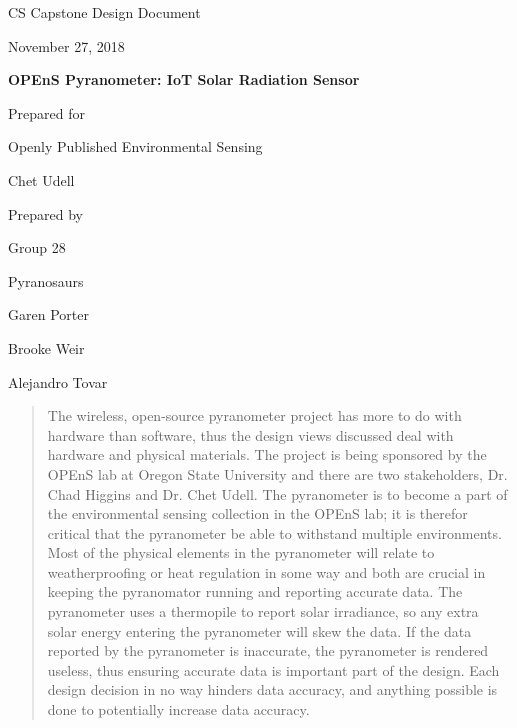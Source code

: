 \documentclass[10pt,draftclsnofoot,onecolumn,letterpaper]{article}
\def \CapstoneTeamName{		Pyranosaurs}
\def \CapstoneTeamNumber{		28}
\def \GroupMemberOne{			Garen Porter}
\def \GroupMemberTwo{			Brooke Weir}
\def \GroupMemberThree{			Alejandro Tovar}
\def \CapstoneProjectName{		OPEnS Pyranometer: IoT Solar Radiation Sensor}
\def \CapstoneSponsorCompany{	Openly Published Environmental Sensing}
\def \CapstoneSponsorPerson{		Chet Udell}
\def \DocType{		%
				Design Document
				}
\newcommand{\NameSigPair}[1]{\par
\makebox[2.75in][r]{#1} \hfil 	\makebox[3.25in]{\makebox[2.25in]{\hrulefill} \hfill		\makebox[.75in]{\hrulefill}}
\par\vspace{-12pt} \textit{\tiny\noindent
\makebox[2.75in]{} \hfil		\makebox[3.25in]{\makebox[2.25in][r]{Signature} \hfill	\makebox[.75in][r]{Date}}}}
\renewcommand{\NameSigPair}[1]{#1}
\begin{document}
\begin{titlepage}
    \begin{singlespace}
        \hfill 
        \par\vspace{.2in}
        \centering
        \scshape{
            \huge CS Capstone \DocType \par
            {\large November 27, 2018}\par
            \vspace{.5in}
            \textbf{\Huge\CapstoneProjectName}\par
            \vfill
            {\large Prepared for}\par
            \Huge \CapstoneSponsorCompany\par
            \vspace{5pt}
            {\Large\NameSigPair{\CapstoneSponsorPerson}\par}
            {\large Prepared by }\par
            Group\CapstoneTeamNumber\par
            \CapstoneTeamName\par 
            \vspace{5pt}
            {\Large
                \NameSigPair{\GroupMemberOne}\par
                \NameSigPair{\GroupMemberTwo}\par
                \NameSigPair{\GroupMemberThree}\par
            }
            \vspace{20pt}
        }
        \begin{abstract}
        The wireless, open-source pyranometer project has more to do with hardware than software, thus the design views discussed deal with hardware and physical materials. The project is being sponsored by the OPEnS lab at Oregon State University and there are two stakeholders, Dr. Chad Higgins and Dr. Chet Udell. The pyranometer is to become a part of the environmental sensing collection in the OPEnS lab; it is therefor critical that the pyranometer be able to withstand multiple environments. Most of the physical elements in the pyranometer will relate to weatherproofing or heat regulation in some way and both are crucial in keeping the pyranomator running and reporting accurate data. The pyranometer uses a thermopile to report solar irradiance, so any extra solar energy entering the pyranometer will skew the data. If the data reported by the pyranometer is inaccurate, the pyranometer is rendered useless, thus ensuring accurate data is important part of the design. Each design decision in no way hinders data accuracy, and anything possible is done to potentially increase data accuracy.

        \end{abstract}     
    \end{singlespace}
\end{titlepage}
\end{document}
